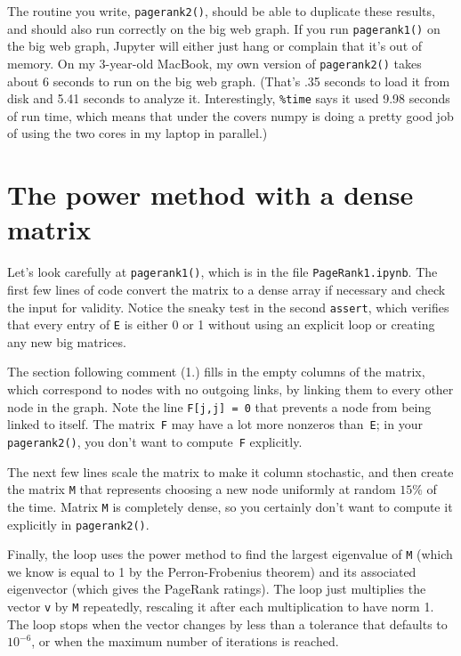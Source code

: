 \documentclass[11pt]{article}
\begin{document}
The routine you write, {\tt pagerank2()}, should be able to duplicate
these results, and should also run correctly on the big web graph.
If you run {\tt pagerank1()} on the big web graph, 
Jupyter will either just hang or complain that it's out of memory.
On my 3-year-old MacBook, my own version of {\tt pagerank2()} 
takes about 6 seconds to run on the big web graph.
(That's .35 seconds to load it from disk and 5.41 seconds to analyze it.
Interestingly, {\tt \%time} says it used 9.98 seconds of run time, 
which means that under the covers numpy is doing a pretty good job of
using the two cores in my laptop in parallel.)

\section{The power method with a dense matrix}

Let's look carefully at {\tt pagerank1()},
which is in the file {\tt PageRank1.ipynb}.
The first few lines of code convert the matrix to a dense
array if necessary and check the input for validity.
Notice the sneaky test in the second {\tt assert}, which
verifies that every entry of {\tt E} is either 0 or 1 without
using an explicit loop or creating any new big matrices.

The section following comment (1.) fills in the empty
columns of the matrix, which correspond to nodes with
no outgoing links, by linking them to every other
node in the graph. 
Note the line {\tt F[j,j] = 0} that prevents a node
from being linked to itself.
The matrix~{\tt F} may have a lot more nonzeros than~{\tt E}; 
in your {\tt pagerank2()}, you don't want to compute~{\tt F} explicitly.

The next few lines scale the matrix to make it column stochastic, 
and then create the matrix {\tt M} that represents choosing
a new node uniformly at random $15\%$ of the time. 
Matrix {\tt M} is completely dense, so you certainly 
don't want to compute it explicitly in {\tt pagerank2()}.

Finally, the loop uses the power method to find the largest
eigenvalue of {\tt M} (which we know is equal to 1
by the Perron-Frobenius theorem) and its associated
eigenvector (which gives the PageRank ratings).
The loop just multiplies the vector {\tt v} by {\tt M} repeatedly, 
rescaling it after each multiplication to have norm 1.  
The loop stops when the vector changes by less than a
tolerance that defaults to $10^{-6}$, or when the maximum
number of iterations is reached.
\end{document}
